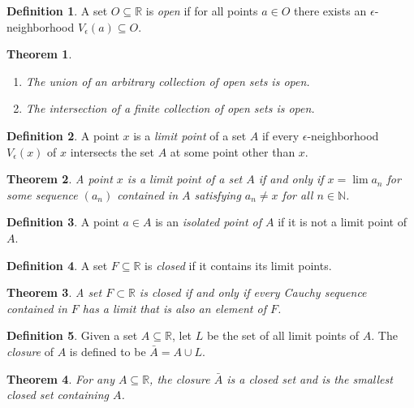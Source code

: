 \documentclass{amsart}
\newtheorem*{theorem}{Theorem}
\theoremstyle{definition}
\newtheorem*{definition}{Definition}
\newcommand{\N}{\mathbb{N}}
\newcommand{\R}{\mathbb{R}}
\begin{document}
\begin{definition}
  A set $O \subseteq \R$ is \emph{open} if for all points $a \in O$ there exists
  an $\epsilon$-neighborhood $V_\epsilon(a) \subseteq O$.
\end{definition}

\begin{theorem}
  \begin{enumerate}[label={(\roman*)}]
    \item The union of an arbitrary collection of open sets is open.
    \item The intersection of a finite collection of open sets is open.
  \end{enumerate}
\end{theorem}

\begin{definition}
  A point $x$ is a \emph{limit point} of a set $A$ if every
  $\epsilon$-neighborhood $V_\epsilon(x)$ of $x$ intersects the set $A$ at some
  point other than $x$.
\end{definition}

\begin{theorem}
  A point $x$ is a limit point of a set $A$ if and only if $x = \lim a_n$ for
  some sequence $(a_n)$ contained in $A$ satisfying $a_n \neq x$ for all $n \in
  \N$.
\end{theorem}

\begin{definition}
  A point $a \in A$ is an \emph{isolated point of $A$} if it is not a limit
  point of $A$.
\end{definition}

\begin{definition}
  A set $F \subseteq \R$ is \emph{closed} if it contains its limit points.
\end{definition}

\begin{theorem}
  A set $F \subset \R$ is closed if and only if every Cauchy sequence contained
  in $F$ has a limit that is also an element of $F$.
\end{theorem}

\begin{definition}
  Given a set $A \subseteq \R$, let $L$ be the set of all limit points of $A$.
  The \emph{closure} of $A$ is defined to be $\bar{A} = A \cup L$.
\end{definition}

\begin{theorem}
  For any $A \subseteq \R$, the closure $\bar{A}$ is a closed set and is the
  smallest closed set containing $A$.
\end{theorem}
\end{document}
